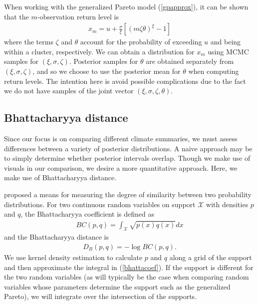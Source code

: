 When working with the generalized Pareto model (\ref{gpapprox}), it can be shown that the $m$-observation return level is
\begin{align}
x_m = u +\frac{\sigma}{\xi}\left[\left(m\zeta\theta\right)^\xi-1\right] \label{rl}
\end{align}
where the terms $\zeta$ and $\theta$ account for the probability of exceeding $u$ and being within a cluster, respectively. We can obtain a distribution for $x_m$ using MCMC samples for $(\xi, \sigma, \zeta)$. Posterior samples for $\theta$ are obtained separately from $(\xi, \sigma, \zeta)$, and so we choose to use the posterior mean for $\theta$ when computing return levels. The intention here is avoid possible complications due to the fact we do not have samples of the joint vector $(\xi, \sigma, \zeta, \theta)$.


\subsection{Bhattacharyya distance}
\label{bhatta}

Since our focus is on comparing different climate summaries, we must assess differences between a variety of posterior distributions. A naive approach may be to simply determine whether posterior intervals overlap. Though we make use of visuals in our comparison, we desire a more quantitative approach. Here, we make use of Bhattacharyya distance.

\cite{bhattacharyya1943measure} proposed a means for measuring the degree of similarity between two probability distributions. For two continuous random variables on support $\mathcal{X}$ with densities $p$ and $q$, the Bhattacharyya coefficient is defined as
\begin{align}
BC(p,q)=\int_\mathcal{X} \sqrt{p(x)q(x)} dx \label{bhattacoef}
\end{align}
and the Bhattacharyya distance is 
\begin{align}
D_B(p,q)=-\log BC(p,q).
\end{align}
We use kernel density estimation to calculate $p$ and $q$ along a grid of the support and then approximate the integral in (\ref{bhattacoef}). If the support is different for the two random variables (as will typically be the case when comparing random variables whose parameters determine the support such as the generalized Pareto), we will integrate over the intersection of the supports.

